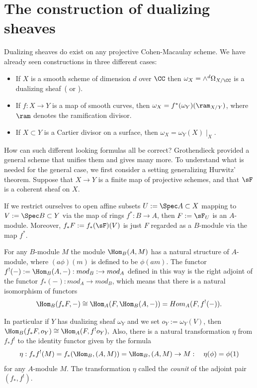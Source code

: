 \section{The construction of dualizing sheaves}\label{dualizing sheaves section}
Dualizing sheaves do exist on any projective Cohen-Macaulay scheme. We have already seen constructions
in three different cases:
\begin{itemize}
 \item If $X$ is a smooth scheme of dimension $d$ over $\CC$ then $\omega_{X}= \wedge^{d} \Omega_{X/\CC}$
is a dualizing sheaf~(\cite[Hartshorne[Section III.7]{Hartshorne1977} or  \cite[p. 648, 708]{Griffiths-Harris1978}). 
\item If $f: X\to Y$ is a map of smooth curves, then $\omega_{X} = f^{*}(\omega_{Y})(\ram_{X/Y})$, where
$\ram$ denotes the ramification divisor.
\item If $X\subset Y$ is a Cartier divisor on a surface, then $\omega_{X} = \omega_{Y}(X)\mid_{X}$.
\end{itemize}

How can such different looking formulas all be correct? Grothendieck provided a general scheme
that unifies them and gives many more. 
To understand what is needed for the general case, we first consider a setting generalizing Hurwitz' theorem.
Suppose that $X\to Y$ is a finite map of projective schemes, and that $\sF$ is a coherent sheaf on $X$.

If we restrict ourselves to open affine subsets
$U := \Spec A\subset X$ mapping to $V:= \Spec B\subset Y$ via the map of rings $f^{*}:B\to A$, then 
$F := \sF_{U}$ is an $A$-module. Moreover,
$f_*{F} := f_*(\sF)(V)$ is just $F$ regarded as a $B$-module via the map $f^{*}$.

For any $B$-module $M$ the module $\Hom_{B}(A, M)$ has a natural structure of $A$-module,
where $(a\phi)(m)$ is defined to be $\phi(am)$. The functor $f^{!}(-) := \Hom_{B}(A, -): mod_{B}:\to mod_{A}$ 
defined in this way is the right adjoint of the functor $f_{*}(-): mod_{A}\to mod_{B}$, 
which means that there is a natural isomorphism of functors
$$
\Hom_{B}(f_{*}F, -) \cong \Hom_{A}(F, \Hom_{B}(A, -)) = Hom_{A}(F, f^{!}(-)).
$$

In particular if $Y$ has dualizing sheaf $\omega_Y$ and we set $o_Y := \omega_Y(V)$, then
$
\Hom_{B}(f_{*}F, o_{Y}) \cong \Hom_{A}(F, f^{!}o_{Y}),
$
Also, there is a natural transformation $\eta$ from $ f_{*}f^{!}$ to the identity functor given by the formula
$$
\eta: f_{*}f^{!}(M) = f_{*}(\Hom_{B}, (A,M)) = \Hom_{B}, (A,M) \to M:\quad \eta(\phi) = \phi(1)
$$
for any $A$-module $M$. 
The transformation $\eta$ called the \emph{counit} of the adjoint pair $(f_{*}, f^{!})$.

